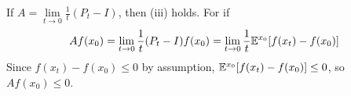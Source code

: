 \documentclass[classnotes]{fillsntsx}
\begin{document}
\begin{note}
If $A = \lim\limits_{t \to 0} \frac{1}{t} (P_t - I)$, then (iii) holds. For if
$$\begin{aligned}
A f(x_0) =  \lim\limits_{t \to 0} \frac{1}{t} (P_t - I) f(x_0) =  \lim_{t \to 0} \frac{1}{t} \mathbb{E}^{x_0} [f(x_t) - f(x_0)]
\end{aligned}$$
Since $f(x_t) - f(x_0) \leq 0$ by assumption, $\mathbb{E}^{x_0} [f(x_t) - f(x_0)] \leq 0$, so $A f(x_0) \leq 0$. 
\end{note}

%
\end{document}
